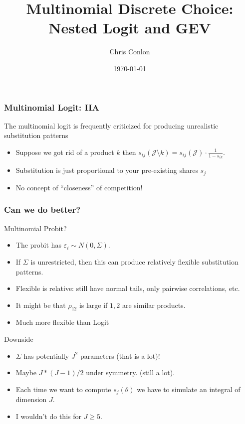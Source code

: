 \documentclass[xcolor=pdftex,dvipsnames,table,mathserif,aspectratio=169]{beamer}
\begin{document}
\title{Multinomial Discrete Choice: Nested Logit and GEV}
\author{Chris Conlon}
\date{\today}

\frame{\titlepage}

\begin{frame}
\frametitle{Multinomial Logit: IIA}
The multinomial logit is frequently criticized for producing unrealistic substitution patterns
\begin{itemize}
\item Suppose we got rid of a product $k$ then $s_{ij}(\mathcal{J}\setminus k) = s_{ij}(\mathcal{J})\cdot \frac{1}{1- s_{ik}}$.
\item Substitution is just proportional to your pre-existing shares $s_j$
\item No concept of ``closeness'' of competition!
\end{itemize}
\end{frame}


\begin{frame}
\frametitle{Can we do better?}
Multinomial Probit?
\begin{itemize}
\item The probit has $\varepsilon_i \sim N(0,\Sigma)$.
\item If $\Sigma$ is unrestricted, then this can produce relatively flexible substitution patterns.
\item Flexible is relative: still have normal tails, only pairwise correlations, etc.
\item It might be that $\rho_{12}$ is large if $1,2$ are similar products.
\item Much more flexible than Logit
\end{itemize}
Downside
\begin{itemize}
\item $\Sigma$ has potentially $J^2$ parameters (that is a lot)!
\item Maybe $J * (J-1)/2$ under symmetry. (still a lot).
\item Each time we want to compute $s_j(\theta)$ we have to simulate an integral of dimension $J$.
\item I wouldn't do this for $J \geq 5$.
\end{itemize}
\end{frame}
\end{document}
